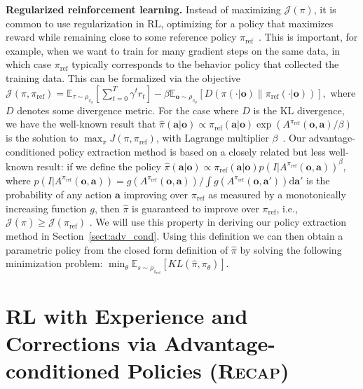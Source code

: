 \documentclass[conference]{IEEEtran}
\newcommand{\ba}{\mathbf{a}}
\newcommand{\bo}{\mathbf{o}}
\newcommand{\piref}{\pi_\text{ref}}
\def \MethodFullName {RL with Experience and Corrections via Advantage-conditioned Policies}
\def \MethodName {\textsc{Recap}}
\begin{document}
\noindent \textbf{Regularized reinforcement learning.} Instead of maximizing $\mathcal{J}(\pi)$, it is common to use regularization in RL, optimizing for a policy that maximizes reward while remaining close to some reference policy $\piref$~\citep{schulman2017proximal,abdolmaleki2018maximum,peng2019advantage,Dayan1997UsingEM,PetersREPS}. This is important, for example, when we want to train for many gradient steps on the same data, in which case $\piref$ typically corresponds to the behavior policy that collected the training data. This can be formalized via the objective 
$\mathcal{J}(\pi, \piref) = \mathbb{E}_{\tau \sim \rho_{\pi_\theta}}[\sum_{t=0}^T \gamma^t r_t] - \beta \mathbb{E}_{\bo \sim \rho_{\pi_\theta}} [D(\pi(\cdot | \bo) \| \pi_\text{ref}(\cdot | \bo)) ], $ where $D$ denotes some divergence metric. For the case where $D$ is the KL divergence, we have the well-known result that \mbox{$\hat{\pi}(\ba | \bo) \propto \piref(\ba | \bo) \exp(A^{\piref}(\bo, \ba) / \beta)$} is the solution to $\max_\pi J(\pi, \piref)$, with Lagrange multiplier $\beta$~\citep{abdolmaleki2018maximum,peng2019advantage,Dayan1997UsingEM,PetersREPS}. Our advantage-conditioned policy extraction method is based on a closely related but less well-known result: if we define the policy \mbox{$\hat{\pi}(\ba | \bo) \propto \piref(\ba | \bo) p(I | A^{\piref}(\bo, \ba))^\beta$},
where $p(I | A^{\piref}(\bo, \ba)) = g(A^{\piref}(\bo, \ba)) / \int g(A^{\piref}(\bo, \ba')) \mathrm{d}\ba'$ is the probability of any action $\ba$ improving over $\piref$ as measured by a monotonically increasing function $g$, then $\hat{\pi}$ is guaranteed to improve over $\piref$, i.e., $\mathcal{J}(\hat{\pi}) \geq \mathcal{J}(\piref)$ \citep{wangmarwil,Frans2025DiffusionGuidance}. We will use this property in deriving our policy extraction method in Section~\ref{sect:adv_cond}.
Using this definition we can then obtain a parametric policy from the closed form definition of $\hat{\pi}$ by solving the following minimization problem: $\min_\theta \mathbb{E}_{s \sim \rho_{\pi_{\text{ref}}}} [KL(\hat{\pi}, \pi_\theta)]$.

\section{\MethodFullName{} (\MethodName{})}
\end{document}
